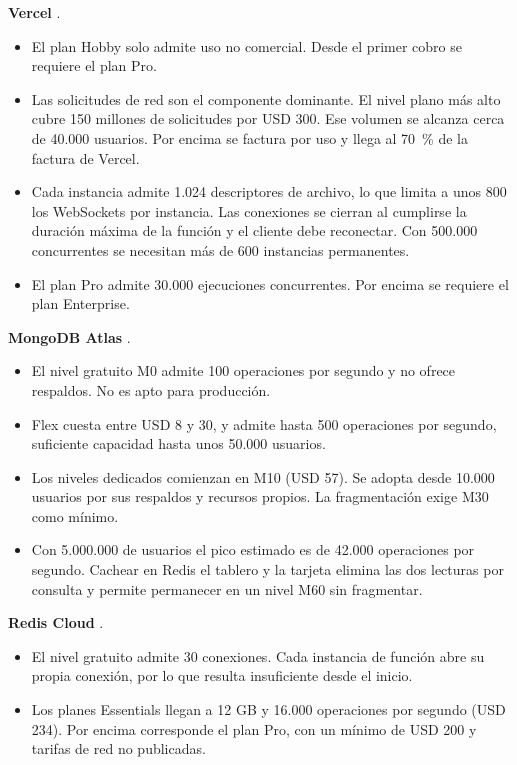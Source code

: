 \textbf{Vercel} \cite{vercel_pricing, vercel_limits}.
\begin{itemize}
  \item El plan Hobby solo admite uso no comercial. Desde el primer cobro se requiere el plan Pro.
  \item Las solicitudes de red son el componente dominante. El nivel plano más alto cubre 150 millones de solicitudes por USD 300. Ese volumen se alcanza cerca de 40.000 usuarios. Por encima se factura por uso y llega al 70~\% de la factura de Vercel.
  \item Cada instancia admite 1.024 descriptores de archivo, lo que limita a unos 800 los WebSockets por instancia. Las conexiones se cierran al cumplirse la duración máxima de la función y el cliente debe reconectar. Con 500.000 concurrentes se necesitan más de 600 instancias permanentes.
  \item El plan Pro admite 30.000 ejecuciones concurrentes. Por encima se requiere el plan Enterprise.
\end{itemize}

\textbf{MongoDB Atlas} \cite{atlas_pricing, atlas_limits}.
\begin{itemize}
  \item El nivel gratuito M0 admite 100 operaciones por segundo y no ofrece respaldos. No es apto para producción.
  \item Flex cuesta entre USD 8 y 30, y admite hasta 500 operaciones por segundo, suficiente capacidad hasta unos 50.000 usuarios.
  \item Los niveles dedicados comienzan en M10 (USD 57). Se adopta desde 10.000 usuarios por sus respaldos y recursos propios. La fragmentación exige M30 como mínimo.
  \item Con 5.000.000 de usuarios el pico estimado es de 42.000 operaciones por segundo. Cachear en Redis el tablero y la tarjeta elimina las dos lecturas por consulta y permite permanecer en un nivel M60 sin fragmentar.
\end{itemize}

\textbf{Redis Cloud} \cite{redis_pricing}.
\begin{itemize}
  \item El nivel gratuito admite 30 conexiones. Cada instancia de función abre su propia conexión, por lo que resulta insuficiente desde el inicio.
  \item Los planes Essentials llegan a 12 GB y 16.000 operaciones por segundo (USD 234). Por encima corresponde el plan Pro, con un mínimo de USD 200 y tarifas de red no publicadas.
\end{itemize}

